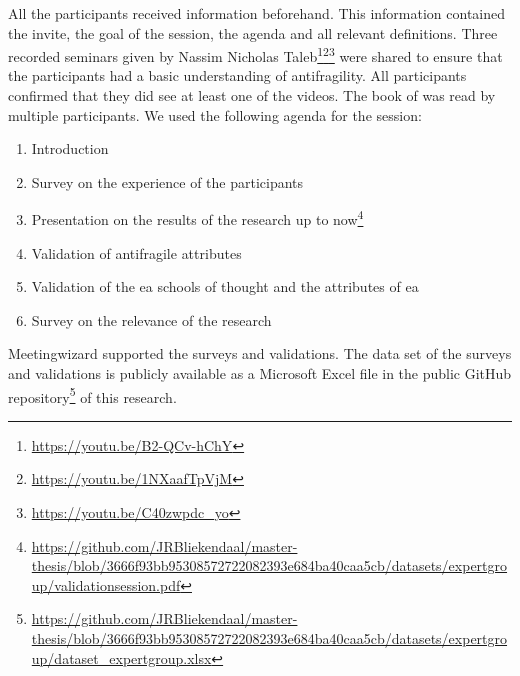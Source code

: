 All the participants received information beforehand. This information contained the invite, the goal of the session, the agenda and all relevant definitions. Three recorded seminars given by Nassim Nicholas Taleb\footnote{\url{https://youtu.be/B2-QCv-hChY}}\footnote{\url{https://youtu.be/1NXaafTpVjM}}\footnote{\url{https://youtu.be/C40zwpdc_yo}} were shared to ensure that the participants had a basic understanding of \gls{antifragility}. All participants confirmed that they did see at least one of the videos. The book of \textcite{Taleb2012} was read by multiple participants.
\newpage
We used the following agenda for the session:
\begin{enumerate}
	\item{Introduction}
	\item{Survey on the experience of the participants}
	\item{Presentation on the results of the research up to now\footnote{\url{https://github.com/JRBliekendaal/master-thesis/blob/3666f93bb95308572722082393e684ba40caa5cb/datasets/expertgroup/validationsession.pdf}}}
	\item{Validation of \gls{antifragile} \glspl{attribute}}
	\item{Validation of the \gls{ea} schools of thought and the \glspl{attribute} of \gls{ea}}
	\item{Survey on the relevance of the research}
\end{enumerate}
Meetingwizard supported the surveys and validations. The data set of the surveys and validations is publicly available as a Microsoft Excel file in the public GitHub repository\footnote{\url{https://github.com/JRBliekendaal/master-thesis/blob/3666f93bb95308572722082393e684ba40caa5cb/datasets/expertgroup/dataset_expertgroup.xlsx}} of this research.
